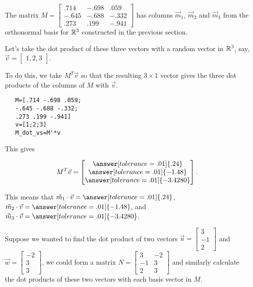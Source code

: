 \documentclass{ximera}
\begin{document}
\begin{example}

   The matrix $M=\begin{bmatrix}
         .714 & -.698 &.059\\-.645&-.688&-.332\\.273&.199&-.941
      \end{bmatrix}$ has columns $\vec{m}_1$, $\vec{m}_2$ and $\vec{m}_3$ from the orthonormal basis for $\mathbb{R}^3$ constructed in the previous section. 

   Let's take the dot product of these three vectors with a random vector in $\mathbb{R}^3$, say, $\vec{v}=\begin{bmatrix}
      1, 2, 3
   \end{bmatrix}$. 

   To do this, we take $M^T\vec{v}$ so that the resulting $3\times 1$ vector gives the three dot products of the columns of $M$ with $\vec{v}$.

   \begin{verbatim}
   M=[.714 -.698 .059;
   -.645 -.688 -.332;
   .273 .199 -.941]
   v=[1;2;3]
   M_dot_vs=M'*v
   \end{verbatim}
   
   This gives

   $$M^T\vec{v}=\begin{bmatrix}
      \answer[tolerance=.01]{.24}\\\answer[tolerance=.01]{-1.48}\\\answer[tolerance=.01]{-3.4280}
   \end{bmatrix}.$$

   This means that $\vec{m}_1\cdot \vec{v}=\answer[tolerance=.01]{.24}$, $\vec{m}_2\cdot\vec{v}=\answer[tolerance=.01]{-1.48}$, and $\vec{m}_3\cdot\vec{v}=\answer[tolerance=.01]{-3.4280}$.

   Suppose we wanted to find the dot product of two vectors $\vec{u}=\begin{bmatrix}
   3\\-1\\2
   \end{bmatrix}$ and $\vec{w}=\begin{bmatrix}
      -2\\3\\3
   \end{bmatrix}$, we could form a matrix $N=\begin{bmatrix}3&-2\\-1&3\\2&3
   \end{bmatrix}$ and similarly calculate the dot products of these two vectors with each basis vector in $M$. 


\end{example}
\end{document}
